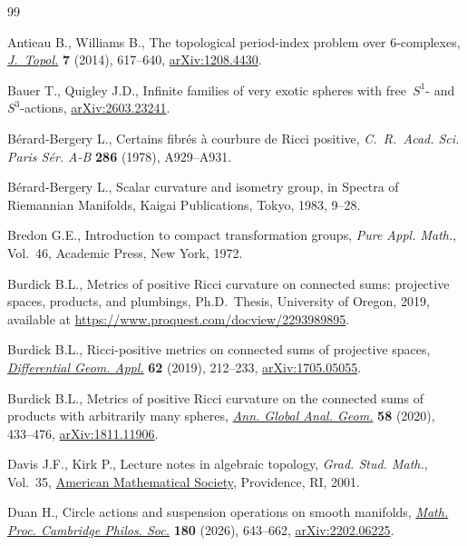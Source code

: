 \begin{thebibliography}{99}
\footnotesize\itemsep=0pt

Antieau B., Williams B., The topological period-index problem over 6-complexes,
  \href{https://doi.org/10.1112/jtopol/jtt042}{\textit{J.~Topol.}} \textbf{7}
  (2014), 617--640, \href{https://arxiv.org/abs/1208.4430}{arXiv:1208.4430}.

Bauer T., Quigley J.D., Infinite families of very exotic spheres with
  free~${S}^1$- and~${S}^3$-actions,
  \href{https://arxiv.org/abs/2603.23241}{arXiv:2603.23241}.

B\'erard-Bergery L., Certains fibr\'es \`a courbure de {R}icci positive,
  \textit{C.~R.~Acad. Sci. Paris S\'er. A-B} \textbf{286} (1978), A929--A931.

B\'erard-Bergery L., Scalar curvature and isometry group, in Spectra of
  Riemannian Manifolds, Kaigai Publications, Tokyo, 1983, 9--28.

Bredon G.E., Introduction to compact transformation groups, \textit{Pure Appl.
  Math.}, Vol.~46, Academic Press, New York, 1972.

Burdick B.L., Metrics of positive {R}icci curvature on connected sums:
  projective spaces, products, and plumbings, Ph.D.~Thesis, {U}niversity of
  Oregon, 2019, available at \url{https://www.proquest.com/docview/2293989895}.

Burdick B.L., Ricci-positive metrics on connected sums of projective spaces,
  \href{https://doi.org/10.1016/j.difgeo.2018.11.005}{\textit{Differential
  Geom. Appl.}} \textbf{62} (2019), 212--233,
  \href{https://arxiv.org/abs/1705.05055}{arXiv:1705.05055}.

Burdick B.L., Metrics of positive {R}icci curvature on the connected sums of
  products with arbitrarily many spheres,
  \href{https://doi.org/10.1007/s10455-020-09732-7}{\textit{Ann. Global Anal.
  Geom.}} \textbf{58} (2020), 433--476,
  \href{https://arxiv.org/abs/1811.11906}{arXiv:1811.11906}.

Davis J.F., Kirk P., Lecture notes in algebraic topology, \textit{Grad. Stud.
  Math.}, Vol.~35, \href{https://doi.org/10.1090/gsm/035}{American Mathematical
  Society}, Providence, RI, 2001.

Duan H., Circle actions and suspension operations on smooth manifolds,
  \href{https://doi.org/10.1017/S0305004125101849}{\textit{Math. Proc.
  Cambridge Philos. Soc.}} \textbf{180} (2026), 643--662,
  \href{https://arxiv.org/abs/2202.06225}{arXiv:2202.06225}.


\end{thebibliography}
